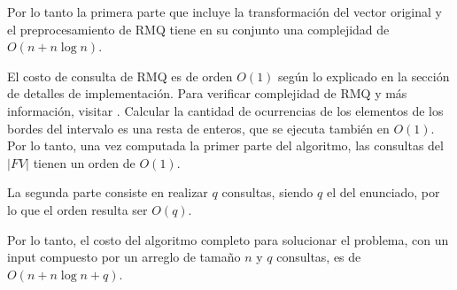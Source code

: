 Por lo tanto la primera parte que incluye la transformación del vector
original y el preprocesamiento de RMQ tiene en su conjunto una complejidad
de $O(n + n\log n)$.

El costo de consulta de RMQ es de orden $O(1)$ según lo explicado en la
sección de detalles de implementación. Para verificar complejidad de RMQ y
más información, visitar \cite{topcoder}. Calcular la cantidad de ocurrencias
de los elementos de los bordes del intervalo es una resta de enteros, que se
ejecuta también en $O(1)$. Por lo tanto, una vez computada la primer parte del
algoritmo, las consultas del $|FV|$ tienen un orden de $O(1)$.

La segunda parte consiste en realizar $q$ consultas, siendo $q$ el del enunciado,
por lo que el orden resulta ser $O(q)$.

Por lo tanto, el costo del algoritmo completo para solucionar el problema, con un
input compuesto por un arreglo de tamaño $n$ y $q$ consultas, es de
$O(n + n\log n + q)$.



